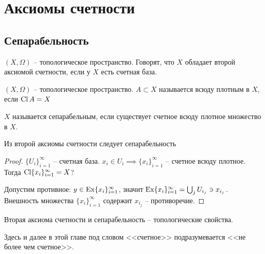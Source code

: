 \documentclass[main]{subfiles}
\begin{document}
\chapter{Аксиомы счетности}
\section{Сепарабельность}
\begin{definition}
    $(X, \Omega)$ -- топологическое пространство.
    Говорят, что $X$ обладает второй аксиомой счетности, если у $X$ есть счетная база.
\end{definition}

\begin{definition}
    $(X, \Omega)$ -- топологическое пространство.
    $A \subset X$ называется всюду плотным в $X$, если $\operatorname{Cl} A =  X$
\end{definition}

\begin{definition}
    $X$ называется сепарабельным, если существует счетное всюду плотное множество в $X$.
\end{definition}

\begin{theorem}
    Из второй аксиомы счетности следует сепарабельность
\end{theorem}
\begin{proof}
    $\{U_i\}_{i = 1}^\infty$ -- счетная база.
    $x_i \in U_i \implies \{x_i\}_{i=1}^\infty$ -- счетное всюду плотное.
    Тогда $\operatorname{Cl} \{x_i\}_{i=1}^\infty = X$?

    Допустим противное:
    $y \in \operatorname{Ex} \{x_i\}_{i=1}^\infty$, значит $\operatorname{Ex} \{x_i\}_{i=1}^\infty = \bigcup_j U_{i_j} \ni x_{i_j}$.
    Внешность множества $\{x_i\}_{i=1}^\infty$ содержит $x_{i_j}$ -- противоречие.
\end{proof}
\begin{remark}
    Вторая аксиома счетности и сепарабельность -- топологические свойства.
\end{remark}

Здесь и далее в этой главе под словом <<счетное>> подразумевается <<не более чем счетное>>.
\end{document}
